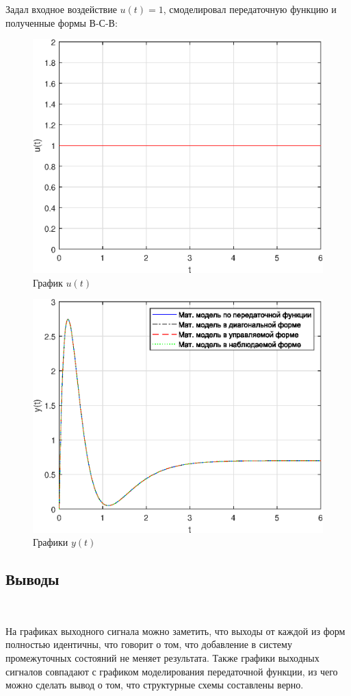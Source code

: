 \documentclass[a4paper]{article}
\begin{document}
Задал входное воздействие $u(t) = 1$, смоделировал передаточную функцию и полученные формы В-С-В:

\begin{figure}
    \centering
    \includegraphics[width=0.75\linewidth]{ex2/u.eps}
    \caption{График $u(t)$}
\end{figure}

\begin{figure}
    \centering
    \includegraphics[width=0.75\linewidth]{ex2/y.eps}
    \caption{Графики $y(t)$}
\end{figure}

\subsection{Выводы}\

На графиках выходного сигнала можно заметить, что выходы от каждой из форм полностью идентичны, что говорит о том, что добавление в систему промежуточных состояний не меняет результата. Также графики выходных сигналов совпадают с графиком моделирования передаточной функции, из чего можно сделать вывод о том, что структурные схемы составлены верно.
\end{document}
